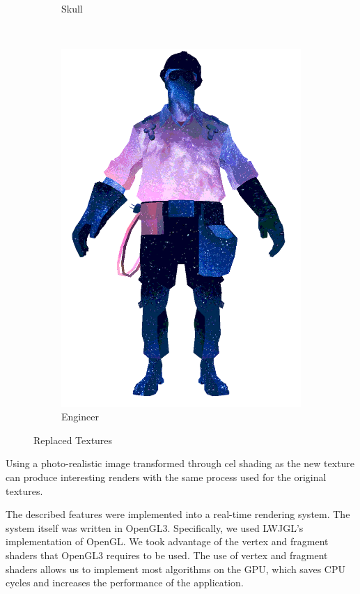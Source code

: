 \begin{figure}[h]
\begin{subfigure}[b]{0.25\textwidth}
        \caption{Skull}
        \label{fig:TextureReplacementSkull}
    \end{subfigure}
     ~
    \centering
    \begin{subfigure}[b]{0.2\textwidth}
        \includegraphics[width=\textwidth]{img/textures/TextureReplacement.png}
        \caption{Engineer}
        \label{fig:TextureReplacement}
    \end{subfigure}
    \caption{Replaced Textures}
    \label{fig:TexturesReplacement}
\end{figure}

Using a photo-realistic image transformed through cel shading as the new texture can produce interesting renders with the same process used for the original textures.


The described features were implemented into a real-time rendering system. The system itself 
was written in OpenGL3. Specifically, we used LWJGL's implementation of OpenGL. We took advantage
of the vertex and fragment shaders that OpenGL3 requires to be used. The use of vertex and fragment
shaders allows us to implement most algorithms on the GPU, which saves CPU cycles and increases the
performance of the application.

